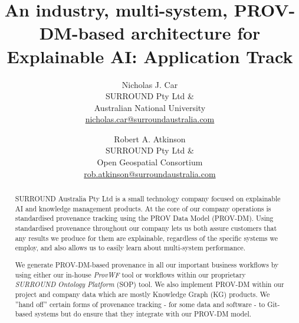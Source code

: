 \documentclass[letterpaper,twocolumn,10pt]{article}
\begin{document}

\date{}

\title{\Large \bf An industry, multi-system, PROV-DM-based architecture for Explainable AI: Application Track}

\author{
{\rm Nicholas J. Car}\\
SURROUND Pty Ltd \&\\
Australian National University\\
\href{mailto:nicholas.car@surroundaustralia.com}{nicholas.car@surroundaustralia.com} 
\and
{\rm Robert A. Atkinson}\\
SURROUND Pty Ltd \&\\
Open Geospatial Consortium\\
\href{mailto:rob.atkinson@surroundaustralia.com}{rob.atkinson@surroundaustralia.com} 
} %

\maketitle

\begin{abstract}

SURROUND Australia Pty Ltd is a small technology company focused on explainable 
AI and knowledge management products. At the core of our company operations is 
standardised provenance tracking using the PROV Data Model (PROV-DM). Using standardised 
provenance throughout our company lets us both assure customers that any results 
we produce for them are explainable, regardless of the specific systems we employ, 
and also allows us to easily learn about multi-system performance.

We generate PROV-DM-based provenance in all our important business workflows by 
using either our in-house \textit{ProvWF} tool or workflows within our 
proprietary \textit{SURROUND Ontology Platform} (SOP) tool. We also implement PROV-DM within our 
project and company data which are mostly Knowledge Graph (KG) products. We ''hand off'' certain
forms of provenance tracking - for some data and software - to Git-based systems but do ensure 
that they integrate with our PROV-DM model.
\end{abstract}
\end{document}
